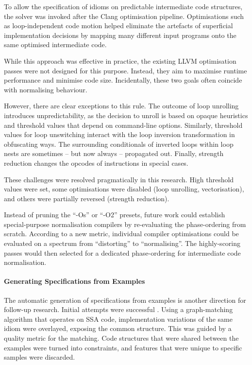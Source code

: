     To allow the specification of idioms on predictable intermediate code
    structures, the solver was invoked after the Clang optimisation pipeline.
    Optimisations such as loop-independent code motion helped eliminate the
    artefacts of superficial implementation decisions by mapping many different
    input programs onto the same optimised intermediate code.

    While this approach was effective in practice, the existing LLVM
    optimisation passes were not designed for this purpose.
    Instead, they aim to maximise runtime performance and minimise code size.
    Incidentally, these two goals often coincide with normalising behaviour.

    However, there are clear exceptions to this rule.
    The outcome of loop unrolling introduces unpredictability, as the decision
    to unroll is based on opaque heuristics and threshold values that depend
    on command-line options.
    Similarly, threshold values for loop unswitching interact with the loop
    inversion transformation in obfuscating ways.
    The surrounding conditionals of inverted loops within loop nests are
    sometimes -- but now always -- propagated out.
    Finally, strength reduction changes the opcodes of instructions in special
    cases.

    These challenges were resolved pragmatically in this research.
    High threshold values were set, some optimisations were disabled
    (loop unrolling, vectorisation), and others were partially reversed
    (strength reduction).

    Instead of pruning the ``-Os'' or ``-O2'' presets, future work could
    establish special-purpose normalisation compilers by re-evaluating the
    phase-ordering from scratch.
    According to a new metric, individual compiler optimisations could be
    evaluated on a spectrum from ``distorting'' to ``normalising''.
    The highly-scoring passes would then selected for a dedicated
    phase-ordering for intermediate code normalisation.

    \paragraph*{Generating Specifications from Examples}
    The automatic generation of specifications from examples is another
    direction for follow-up research.
    Initial attempts were successful \citep{DBLP:conf/IEEEpact/CollieGO19}.
    Using a graph-matching algorithm that operates on SSA code, implementation
    variations of the same idiom were overlayed, exposing the common structure.
    This was guided by a quality metric for the matching.
    Code structures that were shared between the examples were turned into
    constraints, and features that were unique to specific samples were
    discarded.

